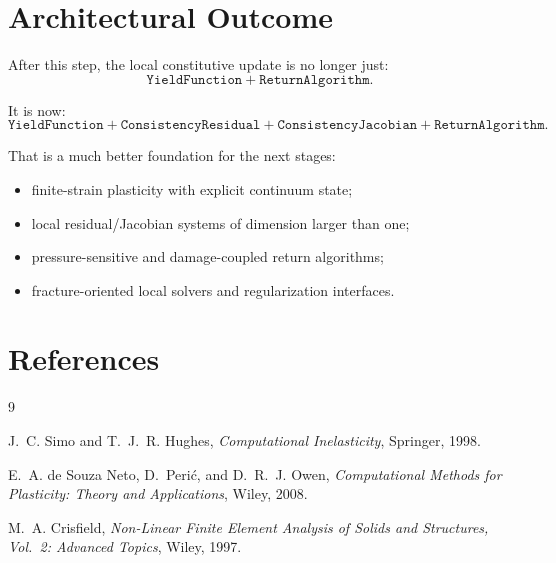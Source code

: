 \section{Architectural Outcome}

After this step, the local constitutive update is no longer just:
\[
  \texttt{YieldFunction} + \texttt{ReturnAlgorithm}.
\]

It is now:
\[
  \texttt{YieldFunction}
  + \texttt{ConsistencyResidual}
  + \texttt{ConsistencyJacobian}
  + \texttt{ReturnAlgorithm}.
\]

That is a much better foundation for the next stages:
\begin{itemize}
  \item finite-strain plasticity with explicit continuum state;
  \item local residual/Jacobian systems of dimension larger than one;
  \item pressure-sensitive and damage-coupled return algorithms;
  \item fracture-oriented local solvers and regularization interfaces.
\end{itemize}

\section{References}

\begin{thebibliography}{9}

J.~C. Simo and T.~J.~R. Hughes,
\emph{Computational Inelasticity},
Springer, 1998.

E.~A. de Souza Neto, D.~Peri\'{c}, and D.~R.~J. Owen,
\emph{Computational Methods for Plasticity: Theory and Applications},
Wiley, 2008.

M.~A. Crisfield,
\emph{Non-Linear Finite Element Analysis of Solids and Structures, Vol.~2:
Advanced Topics},
Wiley, 1997.

\end{thebibliography}
